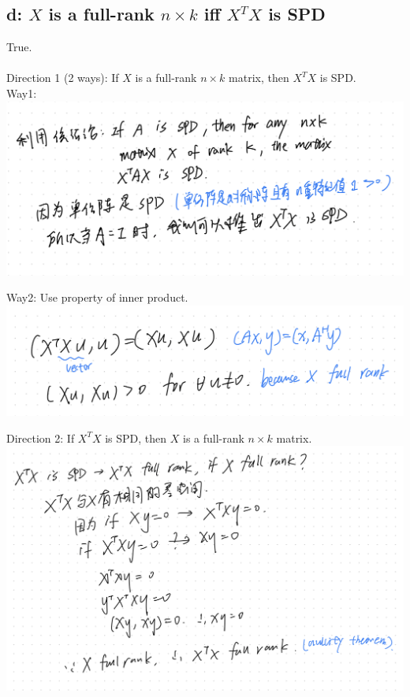 \documentclass{article}
\begin{document}
\subsection{d: $X$ is a full-rank $n \times k$ iff $X^TX$ is SPD}
True.\\
\\
Direction 1 (2 ways): If $X$ is a full-rank $n \times k$ matrix, then $X^TX$ is SPD.\\
Way1:\\
\includegraphics[width=1\linewidth]{pr4-2}

\noindent
Way2: Use property of inner product.\\
\includegraphics[width=1\linewidth]{pr4-3}

\medskip
\noindent
Direction 2: If $X^TX$ is SPD, then $X$ is a full-rank $n \times k$ matrix.\\
\includegraphics[width=1\linewidth]{pr4-4}
\end{document}
